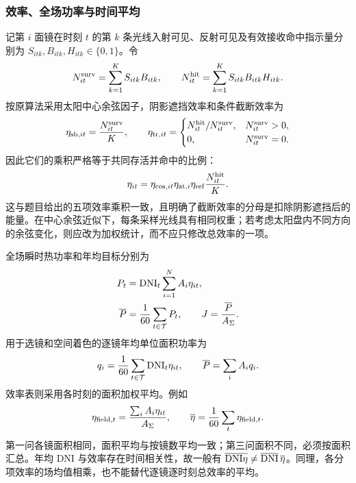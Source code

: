 \subsubsection{效率、全场功率与时间平均}
记第 $i$ 面镜在时刻 $t$ 的第 $k$ 条光线入射可见、反射可见及有效接收命中指示量分别为 $S_{itk},B_{itk},H_{itk}\in\{0,1\}$。令
\begin{equation}
N^{\rm surv}_{it}=\sum_{k=1}^K S_{itk}B_{itk},\qquad
N^{\rm hit}_{it}=\sum_{k=1}^K S_{itk}B_{itk}H_{itk}.
\end{equation}
按原算法采用太阳中心余弦因子，阴影遮挡效率和条件截断效率为
\begin{equation}
\eta_{{\rm sb},it}=\frac{N^{\rm surv}_{it}}{K},\qquad
\eta_{{\rm tr},it}=\begin{cases}N^{\rm hit}_{it}/N^{\rm surv}_{it},&N^{\rm surv}_{it}>0,\\0,&N^{\rm surv}_{it}=0.\end{cases}
\end{equation}
因此它们的乘积严格等于共同存活并命中的比例：
\begin{equation}
\eta_{it}=\eta_{{\rm cos},it}\eta_{{\rm at},i}\eta_{\rm ref}
\frac{N^{\rm hit}_{it}}{K}.
\end{equation}
这与题目给出的五项效率乘积一致，且明确了截断效率的分母是扣除阴影遮挡后的能量。在中心余弦近似下，每条采样光线具有相同权重；若考虑太阳盘内不同方向的余弦变化，则应改为加权统计，而不应只修改总效率的一项。

全场瞬时热功率和年均目标分别为
\begin{align}
P_t&=\mathrm{DNI}_t\sum_{i=1}^{N}A_i\eta_{it},\\
\overline{P}&=\frac1{60}\sum_{t\in\mathcal T}P_t,\qquad
J=\frac{\overline{P}}{A_\Sigma}.
\end{align}
用于选镜和空间着色的逐镜年均单位面积功率为
\begin{equation}
q_i=\frac1{60}\sum_{t\in\mathcal T}\mathrm{DNI}_t\eta_{it},\qquad
\overline{P}=\sum_i A_iq_i.
\end{equation}
效率表则采用各时刻的面积加权平均。例如
\begin{equation}
\eta_{{\rm field},t}=\frac{\sum_iA_i\eta_{it}}{A_\Sigma},\qquad
\overline{\eta}=\frac1{60}\sum_t\eta_{{\rm field},t}.
\end{equation}
第一问各镜面积相同，面积平均与按镜数平均一致；第三问面积不同，必须按面积汇总。年均 DNI 与效率存在时间相关性，故一般有 $\overline{\mathrm{DNI}\eta}\ne\overline{\mathrm{DNI}}\,\overline{\eta}$。同理，各分项效率的场均值相乘，也不能替代逐镜逐时刻总效率的平均。

\pagepart
